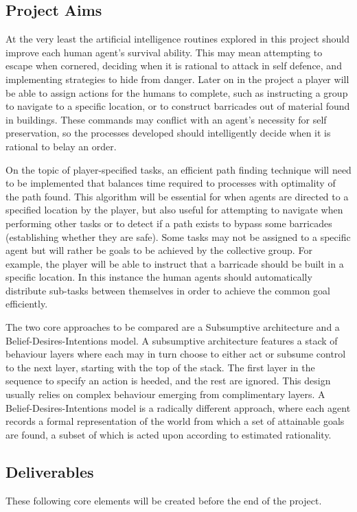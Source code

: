 \documentclass[12pt,a4paper]{article}
\begin{document}
\subsection{Project Aims}\noindent
At the very least the artificial intelligence routines explored in this project should improve each human agent's survival ability. This may mean attempting to escape when cornered, deciding when it is rational to attack in self defence, and implementing strategies to hide from danger. Later on in the project a player will be able to assign actions for the humans to complete, such as instructing a group to navigate to a specific location, or to construct barricades out of material found in buildings. These commands may conflict with an agent's necessity for self preservation, so the processes developed should intelligently decide when it is rational to belay an order.

On the topic of player-specified tasks, an efficient path finding technique will need to be implemented that balances time required to processes with optimality of the path found. This algorithm will be essential for when agents are directed to a specified location by the player, but also useful for attempting to navigate when performing other tasks or to detect if a path exists to bypass some barricades (establishing whether they are safe). Some tasks may not be assigned to a specific agent but will rather be goals to be achieved by the collective group. For example, the player will be able to instruct that a barricade should be built in a specific location. In this instance the human agents should automatically distribute sub-tasks between themselves in order to achieve the common goal efficiently.

The two core approaches to be compared are a Subsumptive architecture \cite{brooks90} and a Belief-Desires-Intentions model. A subsumptive architecture features a stack of behaviour layers where each may in turn choose to either act or subsume control to the next layer, starting with the top of the stack. The first layer in the sequence to specify an action is heeded, and the rest are ignored. This design usually relies on complex behaviour emerging from complimentary layers. A Belief-Desires-Intentions model is a radically different approach, where each agent records a formal representation of the world from which a set of attainable goals are found, a subset of which is acted upon according to estimated rationality.

\subsection{Deliverables}\noindent
These following core elements will be created before the end of the project.
\end{document}
